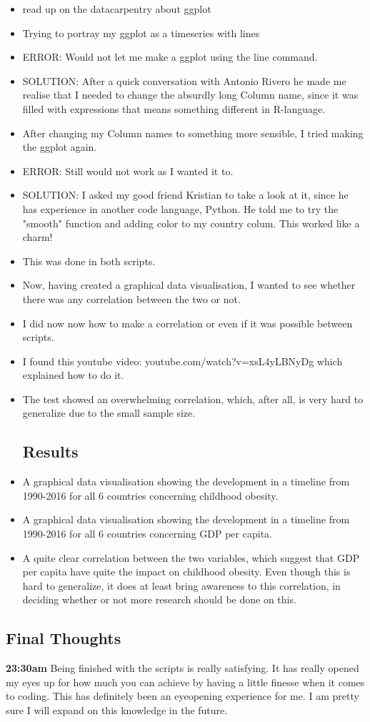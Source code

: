 \documentclass{article}
\begin{document}
\begin{itemize}
\item read up on the datacarpentry about ggplot
\item Trying to portray my ggplot as a timeseries with lines
\item ERROR: Would not let me make a ggplot using the line command.
\item SOLUTION: After a quick conversation with Antonio Rivero he made me realise that I needed to change the absurdly long Column name, since it was filled with expressions that means something different in R-language.
\item After changing my Column names to something more sensible, I tried making the ggplot again.
\item ERROR: Still would not work as I wanted it to.
\item SOLUTION: I asked my good friend Kristian to take a look at it, since he has experience in another code language, Python. He told me to try the "smooth" function and adding color to my country colum. This worked like a charm!
\item This was done in both scripts.
\item Now, having created a graphical data visualisation, I wanted to see whether there was any correlation between the two or not.
\item I did now now how to make a correlation or even if it was possible between scripts.
\item I found this youtube video: youtube.com/watch?v=xsL4yLBNyDg which explained how to do it.
\item The test showed an overwhelming correlation, which, after all, is very hard to generalize due to the small sample size.

\subsection{Results}
\item A graphical data visualisation showing the development in a timeline from 1990-2016 for all 6 countries concerning childhood obesity.
\item A graphical data visualisation showing the development in a timeline from 1990-2016 for all 6 countries concerning GDP per capita.
\item A quite clear correlation between the two variables, which suggest that GDP per capita have quite the impact on childhood obesity. Even though this is hard to generalize, it does at least bring awareness to this correlation, in deciding whether or not more research should be done on this.

\end{itemize}

\subsection{Final Thoughts}
\textbf{23:30am} Being finished with the scripts is really satisfying. It has really opened my eyes up for how much you can achieve by having a little finesse when it comes to coding. This has definitely been an eyeopening experience for me. I am pretty sure I will expand on this knowledge in the future.
\end{document}
